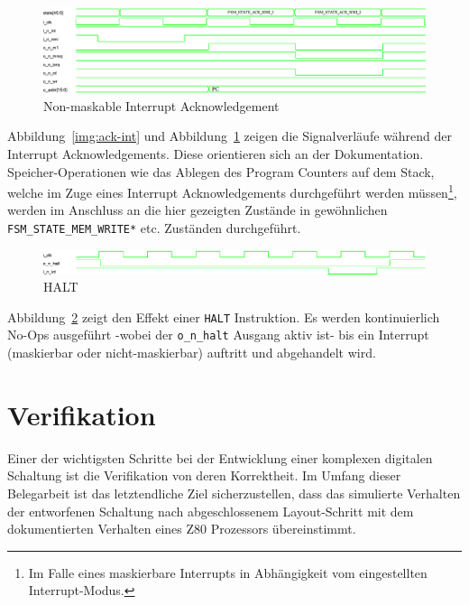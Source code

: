 \documentclass[ngerman, cd=lightcolor]{tudscrreprt}
\begin{document}
\begin{figure}[htbp]
  \centering
    \includegraphics[width=\textwidth]{resources/pdf/ack-nmi.pdf}
  \caption{Non-maskable Interrupt Acknowledgement}
  \label{img:ack-nmi}
\end{figure}

\noindent
Abbildung~\ref{img:ack-int} und Abbildung~\ref{img:ack-nmi} zeigen die
Signalverläufe während der Interrupt Acknowledgements. Diese orientieren sich
an der Dokumentation. Speicher-Operationen wie das Ablegen des Program Counters
auf dem Stack, welche im Zuge eines Interrupt Acknowledgements durchgeführt
werden müssen\footnote{Im Falle eines maskierbare Interrupts in Abhängigkeit
vom eingestellten Interrupt-Modus.}, werden im Anschluss an die hier gezeigten
Zustände in gewöhnlichen \texttt{FSM\_STATE\_MEM\_WRITE*} etc. Zuständen
durchgeführt.

\begin{figure}[htbp]
  \centering
    \includegraphics[width=\textwidth]{resources/pdf/halt.pdf}
  \caption{HALT}
  \label{img:halt}
\end{figure}

Abbildung~\ref{img:halt} zeigt den Effekt einer \texttt{HALT} Instruktion. Es
werden kontinuierlich No-Ops ausgeführt -wobei der \texttt{o\_n\_halt} Ausgang
aktiv ist- bis ein Interrupt (maskierbar oder nicht-maskierbar) auftritt und
abgehandelt wird.

\chapter{Verifikation\label{ch:verification}}

Einer der wichtigsten Schritte bei der Entwicklung einer komplexen digitalen
Schaltung ist die Verifikation von deren Korrektheit. Im Umfang dieser
Belegarbeit ist das letztendliche Ziel sicherzustellen, dass das simulierte
Verhalten der entworfenen Schaltung nach abgeschlossenem Layout-Schritt mit dem
dokumentierten Verhalten eines Z80 Prozessors übereinstimmt.
\end{document}
